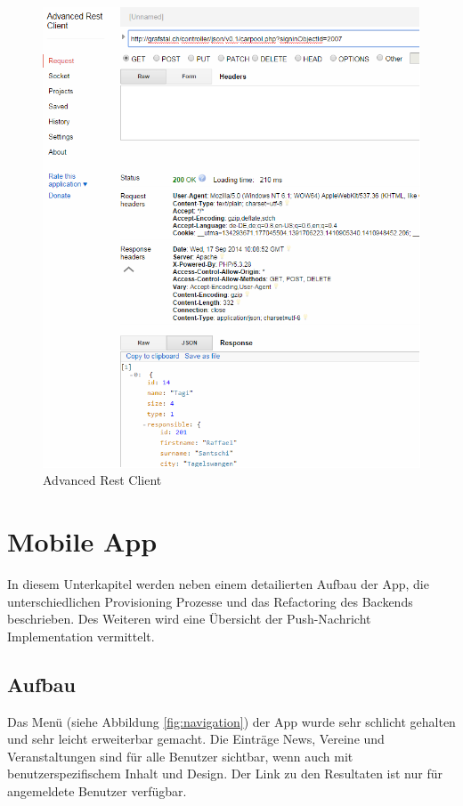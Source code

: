 \begin{figure}[h]
\centering
\includegraphics[scale=0.5]{images/advanced_rest_client.png}
\caption{Advanced Rest Client}
\label{fig:advanced_rest_client}
\end{figure}

\FloatBarrier


\clearpage
\section{Mobile App}\label{impl_moblie_app}
In diesem Unterkapitel werden neben einem detailierten Aufbau der App, die unterschiedlichen Provisioning Prozesse und das Refactoring des Backends beschrieben. Des Weiteren wird eine Übersicht der Push-Nachricht Implementation vermittelt.

\subsection{Aufbau}
Das Menü (siehe Abbildung \ref{fig:navigation}) der App wurde sehr schlicht gehalten und sehr leicht erweiterbar gemacht. Die Einträge News, Vereine und Veranstaltungen sind für alle Benutzer sichtbar, wenn auch mit benutzerspezifischem Inhalt und Design. Der Link zu den Resultaten ist nur für angemeldete Benutzer verfügbar.

